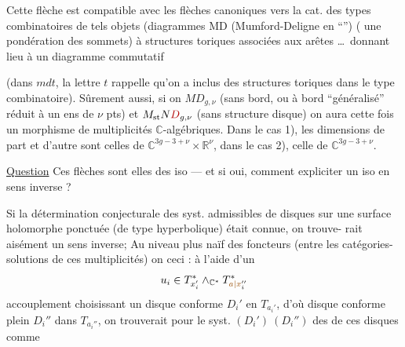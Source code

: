 Cette flèche est compatible avec les
flèches canoniques vers la cat. des
types combinatoires de tels objets
(diagrammes MD (Mumford-Deligne en
``'') ( une pondération
des sommets) à structures toriques
associées aux arêtes \ldots\ donnant lieu à un
diagramme commutatif

(dans $mdt$, la lettre $t$ rappelle qu'on a inclus
des structures toriques dans le type
combinatoire). Sûrement aussi, si on
 $MD_{g,\nu}$ (sans bord, ou à bord
``généralisé'' réduit à un ens de $\nu$ pts)
et $M_{\mathrm{st}}N\deleted{D}_{g,\nu}$ (sans structure disque) on
aura
cette fois un morphisme de 
multiplicités  $\mathbb C$-algébriques.
Dans le cas 1), les dimensions  de
part et d'autre sont celles de $\mathbb C^{3g-3+\nu}\times\mathbb R^\nu$,
dans le cas 2),  celle de $\mathbb C^{3g-3+\nu}$.

\uline{Question} Ces flèches sont elles des iso
--- et si oui, comment expliciter un
iso en sens inverse ? 

Si la détermination conjecturale des
syst. admissibles de disques sur une
surface holomorphe  ponctuée (de type
hyperbolique) était connue, on trouve-
rait aisément  un sens
inverse; Au niveau plus naïf des
foncteurs (entre les catégories-solutions
de ces multiplicités) on 
ceci : à l'aide d'un 
\[
u_i\in T_{x_i'}^*\wedge_{\mathbb C^*}T_{\unsure{a|x}_i''}^*
\]
  accouplement 
choisissant un  disque conforme
$D_i'$ en $T_{a_i'}$,  d'où disque
conforme plein $D_i''$ dans $T_{a_i''}$, on
trouverait  pour le syst. $(D_i')\ (D_i'')$
des  de ces disques comme

